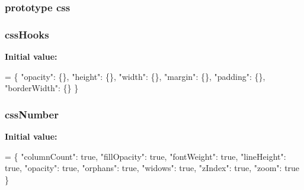 \hypertarget{jquery-1_810_82-vsdoc_8js_aa8c6af259210b33d20642f8ee70cbfa4}{
\subsubsection[{css}]{ {\bf prototype} css}}\label{jquery-1_810_82-vsdoc_8js_aa8c6af259210b33d20642f8ee70cbfa4}
\hypertarget{jquery-1_810_82-vsdoc_8js_a9966a63bdc4e33753dbe36a83e7f96bf}{
\subsubsection[{css\-Hooks}]{ css\-Hooks}}\label{jquery-1_810_82-vsdoc_8js_a9966a63bdc4e33753dbe36a83e7f96bf}
{\bfseries Initial value\-:}
\begin{DoxyCode}
= \{ \textcolor{stringliteral}{"opacity"}: \{\},
\textcolor{stringliteral}{"height"}: \{\},
\textcolor{stringliteral}{"width"}: \{\},
\textcolor{stringliteral}{"margin"}: \{\},
\textcolor{stringliteral}{"padding"}: \{\},
\textcolor{stringliteral}{"borderWidth"}: \{\} \}
\end{DoxyCode}
\hypertarget{jquery-1_810_82-vsdoc_8js_ac1d75df6fff702cd103f92cce26e1b29}{
\subsubsection[{css\-Number}]{ css\-Number}}\label{jquery-1_810_82-vsdoc_8js_ac1d75df6fff702cd103f92cce26e1b29}
{\bfseries Initial value\-:}
\begin{DoxyCode}
= \{ \textcolor{stringliteral}{"columnCount"}: \textcolor{keyword}{true},
\textcolor{stringliteral}{"fillOpacity"}: \textcolor{keyword}{true},
\textcolor{stringliteral}{"fontWeight"}: \textcolor{keyword}{true},
\textcolor{stringliteral}{"lineHeight"}: \textcolor{keyword}{true},
\textcolor{stringliteral}{"opacity"}: \textcolor{keyword}{true},
\textcolor{stringliteral}{"orphans"}: \textcolor{keyword}{true},
\textcolor{stringliteral}{"widows"}: \textcolor{keyword}{true},
\textcolor{stringliteral}{"zIndex"}: \textcolor{keyword}{true},
\textcolor{stringliteral}{"zoom"}: \textcolor{keyword}{true} \}
\end{DoxyCode}
